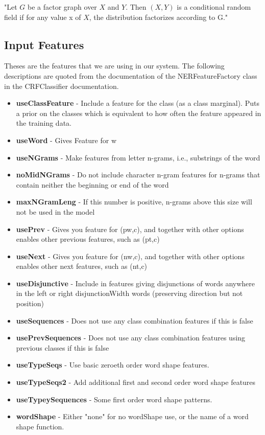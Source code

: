 \documentclass[letterpaper, 10 pt, conference]{ieeeconf}
\begin{document}
"Let $G$ be a factor graph over $X$ and $Y$. Then $(X, Y)$ is a conditional random field if for any value x of $X$, the distribution factorizes according to G." \cite{c6} 

\subsection{Input Features}
Theses are the features that we are using in our system. The following descriptions are quoted from the documentation of the NERFeatureFactory class in the CRFClassifier documentation.\cite{c12}
\begin{itemize}
\item \textbf{useClassFeature} - Include a feature for the class (as a class marginal). Puts a prior on the classes which is equivalent to how often the feature appeared in the training data.
\item \textbf{useWord} - Gives Feature for w
\item \textbf{useNGrams} - Make features from letter n-grams, i.e., substrings of the word
\item \textbf{noMidNGrams} - Do not include character n-gram features for n-grams that contain neither the beginning or end of the word
\item \textbf{maxNGramLeng} - If this number is positive, n-grams above this size will not be used in the model
\item \textbf{usePrev} - Gives you feature for (pw,c), and together with other options enables other previous features, such as (pt,c)
\item \textbf{useNext} - Gives you feature for (nw,c), and together with other options enables other next features, such as (nt,c)
\item \textbf{useDisjunctive} - Include in features giving disjunctions of words anywhere in the left or right disjunctionWidth words (preserving direction but not position)
\item \textbf{useSequences} - Does not use any class combination features if this is false
\item \textbf{usePrevSequences} - Does not use any class combination features using previous classes if this is false
\item \textbf{useTypeSeqs} - Use basic zeroeth order word shape features.
\item \textbf{useTypeSeqs2} - Add additional first and second order word shape features
\item \textbf{useTypeySequences} - Some first order word shape patterns.
\item \textbf{wordShape} - Either "none" for no wordShape use, or the name of a word shape function.
\end{itemize}
\end{document}
